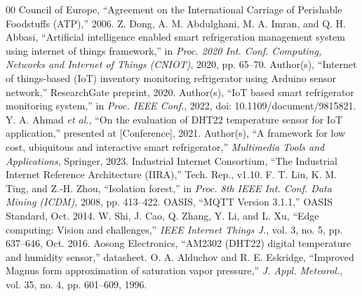 \documentclass[conference]{IEEEtran}
\begin{document}
\balance
\begin{thebibliography}{00}
 Council of Europe, ``Agreement on the International Carriage of Perishable Foodstuffs (ATP),'' 2006.
 Z. Dong, A. M. Abdulghani, M. A. Imran, and Q. H. Abbasi, ``Artificial intelligence enabled smart refrigeration management system using internet of things framework,'' in \emph{Proc. 2020 Int. Conf. Computing, Networks and Internet of Things (CNIOT)}, 2020, pp. 65--70.
 Author(s), ``Internet of things-based (IoT) inventory monitoring refrigerator using Arduino sensor network,'' ResearchGate preprint, 2020.
 Author(s), ``IoT based smart refrigerator monitoring system,'' in \emph{Proc. IEEE Conf.}, 2022, doi: 10.1109/document/9815821.
 Y. A. Ahmad \emph{et al.}, ``On the evaluation of DHT22 temperature sensor for IoT application,'' presented at [Conference], 2021.
 Author(s), ``A framework for low cost, ubiquitous and interactive smart refrigerator,'' \emph{Multimedia Tools and Applications}, Springer, 2023.
 Industrial Internet Consortium, ``The Industrial Internet Reference Architecture (IIRA),'' Tech. Rep., v1.10.
 F. T. Liu, K. M. Ting, and Z.-H. Zhou, ``Isolation forest,'' in \emph{Proc. 8th IEEE Int. Conf. Data Mining (ICDM)}, 2008, pp. 413--422.
 OASIS, ``MQTT Version 3.1.1,'' OASIS Standard, Oct. 2014.
 W. Shi, J. Cao, Q. Zhang, Y. Li, and L. Xu, ``Edge computing: Vision and challenges,'' \emph{IEEE Internet Things J.}, vol. 3, no. 5, pp. 637--646, Oct. 2016.
 Aosong Electronics, ``AM2302 (DHT22) digital temperature and humidity sensor,'' datasheet.
 O. A. Alduchov and R. E. Eskridge, ``Improved Magnus form approximation of saturation vapor pressure,'' \emph{J. Appl. Meteorol.}, vol. 35, no. 4, pp. 601--609, 1996.
\end{thebibliography}
\end{document}
